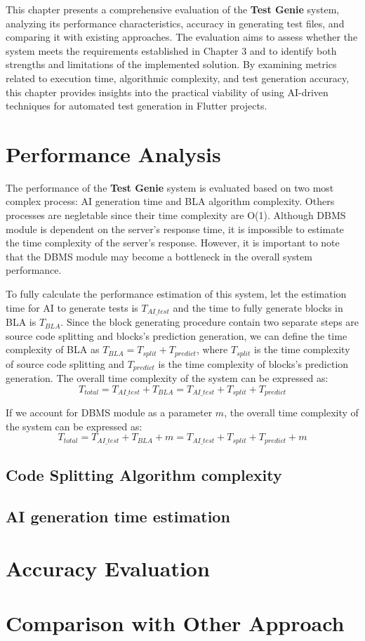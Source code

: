 This chapter presents a comprehensive evaluation of the \textbf{Test Genie} system, analyzing its performance characteristics, accuracy in generating test files, and comparing it with existing approaches. The evaluation aims to assess whether the system meets the requirements established in Chapter 3 and to identify both strengths and limitations of the implemented solution. By examining metrics related to execution time, algorithmic complexity, and test generation accuracy, this chapter provides insights into the practical viability of using AI-driven techniques for automated test generation in Flutter projects.

\section{Performance Analysis}

The performance of the \textbf{Test Genie} system is evaluated based on two most complex process: AI generation time and BLA algorithm complexity. Others processes are negletable since their time complexity are O(1). Although DBMS module is dependent on the server's response time, it is impossible to estimate the time complexity of the server's response. However, it is important to note that the DBMS module may become a bottleneck in the overall system performance.

To fully calculate the performance estimation of this system, let the estimation time for AI to generate tests is $T_{AI\_test}$ and the time to fully generate blocks in BLA is $T_{BLA}$. Since the block generating procedure contain two separate steps are source code splitting and blocks's prediction generation, we can define the time complexity of BLA as $T_{BLA} = T_{split} + T_{predict}$, where $T_{split}$ is the time complexity of source code splitting and $T_{predict}$ is the time complexity of blocks's prediction generation. The overall time complexity of the system can be expressed as:
\begin{equation}
T_{total} = T_{AI\_test} + T_{BLA} = T_{AI\_test} + T_{split} + T_{predict}
\end{equation}

If we account for DBMS module as a parameter $m$, the overall time complexity of the system can be expressed as:
\begin{equation}
T_{total} = T_{AI\_test} + T_{BLA} + m = T_{AI\_test} + T_{split} + T_{predict} + m
\end{equation}


\subsection{Code Splitting Algorithm complexity}

\subsection{AI generation time estimation}


\section{Accuracy Evaluation}


\section{Comparison with Other Approach}